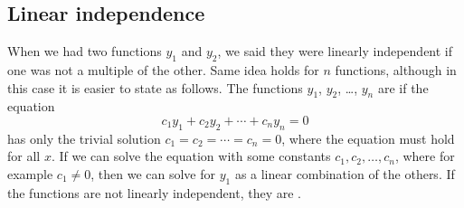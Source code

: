 \subsection{Linear independence}

When we had two functions $y_1$ and $y_2$, we said they were linearly
independent if one was not a multiple of the other.  Same idea holds for
$n$ functions, although in this case it is easier to state as follows. The functions
$y_1$, $y_2$, \ldots, $y_n$ are \emph{} if
the equation
\begin{equation*}
c_1 y_1 + c_2 y_2 + \cdots + c_n y_n = 0 
\end{equation*}
has only the trivial solution $c_1 = c_2 = \cdots = c_n = 0$, where the
equation must hold for all $x$.  If we can
solve the equation with some constants $c_1,c_2,\ldots,c_n$, where for example $c_1 \not= 0$, then we
can solve for $y_1$ as a linear combination of the others.  If the functions
are not
linearly independent, they are \emph{}.


